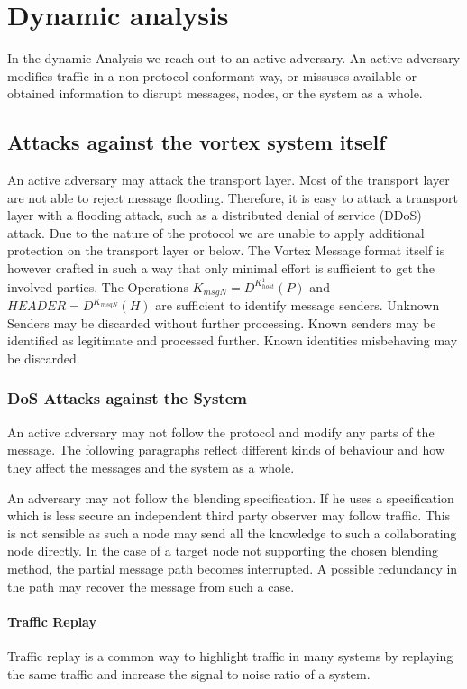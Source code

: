 \chapter{Dynamic analysis}
In the dynamic Analysis we reach out to an active adversary. An active adversary modifies traffic in a non protocol conformant way, or missuses available or obtained information to disrupt messages, nodes, or the system as a whole.

\section{Attacks against the vortex system itself}
An active adversary may attack the transport layer. Most of the transport layer are not able to reject message flooding. Therefore, it is easy to attack a transport layer with a flooding attack, such as a distributed denial of service (DDoS) attack. Due to the nature of the protocol we are unable to apply additional protection on the transport layer or below. The Vortex Message format itself is however crafted in such a way that only minimal effort is sufficient to get the involved parties. The Operations $ K_{msgN}=D^{K^{1}_{host}}\left(P\right)$ and $HEADER=D^{K_{msgN}}\left(H\right)$ are sufficient to identify message senders. Unknown Senders may be discarded without further processing. Known senders may be identified as legitimate and processed further. Known identities misbehaving may be discarded.


\subsection{DoS Attacks against the System}
An active adversary may not follow the protocol and modify any parts of the message. The following paragraphs reflect different kinds of behaviour and how they affect the messages and the system as a whole.

An adversary may not follow the blending specification. If he uses a specification which is less secure an independent third party observer may follow traffic. This is not sensible as such a node may send all the knowledge to such a collaborating node directly. In the case of a  target node not supporting the chosen blending method, the partial message path becomes interrupted. A possible redundancy in the path may recover the message from such a case.

\subsubsection{Traffic Replay}
Traffic replay is a common way to highlight traffic in many systems by replaying the same traffic and increase the signal to noise ratio of a system. 

